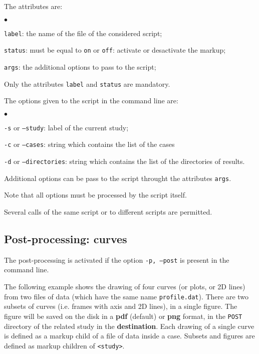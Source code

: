 \documentclass[a4paper,10pt,twoside]{csshortdoc}
\begin{document}
The attributes are:
\begin{list}{$\bullet$}{}
\item \texttt{label}: the name of the file of the considered script;
\item \texttt{status}: must be equal to \texttt{on} or \texttt{off}:
activate or desactivate the markup;
\item \texttt{args}: the additional options to pass to the script;
\end{list}

Only the attributes \texttt{label} and \texttt{status} are mandatory.

The options given to the script in the command line are:
\begin{list}{$\bullet$}{}
\item \texttt{-s} or \texttt{--study}: label of the current study;
\item \texttt{-c} or \texttt{--cases}: string which contains the list of the cases
\item \texttt{-d} or \texttt{--directories}: string which contains the list
of the directories of results.
\end{list}
Additional options can be pass to the script throught the attributes \texttt{args}.

Note that all options must be processed by the script itself.

Several calls of the same script or to different scripts are permitted.

\subsection{Post-processing: curves}\label{sec:curves}

The post-processing is activated if the option \texttt{-p, --post} is present
in the command line.

The following example shows the drawing of four curves (or plots, or 2D lines)
from two files of data (which have the same name \texttt{profile.dat}). There
are two subsets of curves (i.e. frames with axis and 2D lines), in a single
figure. The figure will be saved on the disk in a \textbf{pdf} (default)
or \textbf{png} format, in the \texttt{POST} directory of the related study
in the \textbf{destination}. Each drawing of a single curve is defined as a
markup child of a file of data inside a case. Subsets and figures are defined
as markup children of \texttt{<study>}.
\end{document}
